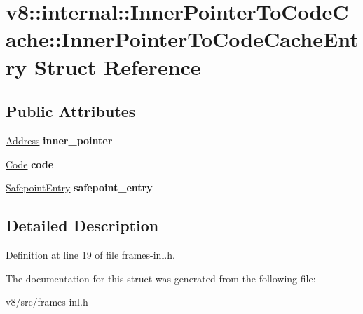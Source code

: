 \hypertarget{structv8_1_1internal_1_1InnerPointerToCodeCache_1_1InnerPointerToCodeCacheEntry}{}\section{v8\+:\+:internal\+:\+:Inner\+Pointer\+To\+Code\+Cache\+:\+:Inner\+Pointer\+To\+Code\+Cache\+Entry Struct Reference}
\label{structv8_1_1internal_1_1InnerPointerToCodeCache_1_1InnerPointerToCodeCacheEntry}
\subsection*{Public Attributes}
\begin{DoxyCompactItemize}
\item 
\mbox{\label{structv8_1_1internal_1_1InnerPointerToCodeCache_1_1InnerPointerToCodeCacheEntry_aa31c0b698b8935a0a890cd550f3b61c1}} 
\mbox{\hyperlink{classuintptr__t}{Address}} {\bfseries inner\+\_\+pointer}
\item 
\mbox{\label{structv8_1_1internal_1_1InnerPointerToCodeCache_1_1InnerPointerToCodeCacheEntry_a989114e5ee87149c3af23085189e2e7a}} 
\mbox{\hyperlink{classv8_1_1internal_1_1Code}{Code}} {\bfseries code}
\item 
\mbox{\label{structv8_1_1internal_1_1InnerPointerToCodeCache_1_1InnerPointerToCodeCacheEntry_a16d432760b60d92721b309f0d01b8837}} 
\mbox{\hyperlink{classv8_1_1internal_1_1SafepointEntry}{Safepoint\+Entry}} {\bfseries safepoint\+\_\+entry}
\end{DoxyCompactItemize}


\subsection{Detailed Description}


Definition at line 19 of file frames-\/inl.\+h.



The documentation for this struct was generated from the following file\+:\begin{DoxyCompactItemize}
\item 
v8/src/frames-\/inl.\+h\end{DoxyCompactItemize}
